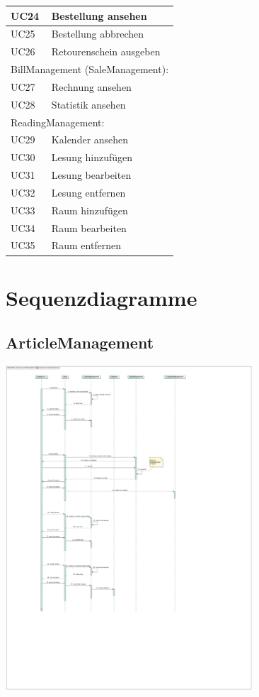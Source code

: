 \documentclass[a4paper]{article}
\begin{document}
\begin{longtable}{|p{100px}|p{250px}|}
	UC24 & Bestellung ansehen  \\ \hline
	UC25 & Bestellung abbrechen  \\ \hline
	UC26 & Retourenschein ausgeben  \\ \hline
	\multicolumn{2}{|l|}{BillManagement (SaleManagement):}  \\ \hline
	UC27 & Rechnung ansehen \\ \hline
	UC28 & Statistik ansehen \\ \hline
	\multicolumn{2}{|l|}{ReadingManagement:} \\ \hline
	UC29 & Kalender ansehen \\ \hline
	UC30 & Lesung hinzufügen \\ \hline
	UC31 & Lesung bearbeiten \\ \hline
	UC32 & Lesung entfernen \\ \hline
	UC33 & Raum hinzufügen \\ \hline
	UC34 & Raum bearbeiten \\ \hline
	UC35 & Raum entfernen \\ \hline
\end{longtable}


\section{Sequenzdiagramme}

\subsection{ArticleManagement}

\includegraphics[width=350px]{sd-articlemanagement.jpg}
\end{document}
